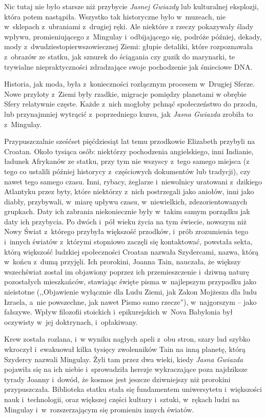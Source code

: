 \documentclass[oneside,polish,12pt,sfheadings]{mwbk}
\begin{document}
Nic tutaj nie było starsze niż przybycie \emph{Jasnej Gwiazdy} lub
kulturalnej eksplozji, która potem nastąpiła. Wszystko tak historyczne
było w~muzeach, nie w~sklepach z~ubraniami z~drugiej ręki. Ale niektóre
z rzeczy pokazywały ślady wpływu, promieniującego z~Mingulay i~odbijającego się, podróże później, dekady, mody z~dwudziestopierwszowiecznej Ziemi: głupie detaliki, które rozpoznawała z~obrazów ze statku, jak sznurek do ściągania czy guzik do marynarki, te
trywialne niepraktyczności zdradzające swoje pochodzenie jak śmieciowe
DNA.

Historia, jak moda, była z~konieczności rozłącznym procesem w~Drugiej
Sferze. Nowe przyloty z~Ziemi były rzadkie, migracje pomiędzy planetami
w obrębie Sfery relatywnie częste. Każde z~nich mogłoby pchnąć
społeczeństwo do przodu, lub przynajmniej wytrącić z~poprzedniego kursu,
jak \emph{Jasna Gwiazda} zrobiła to z~Mingulay.

Przypuszczalnie sześćset pięćdziesiąt lat temu przodkowie Elizabeth
przybyli na Croatan. Około tysiąca osób: niektórzy pochodzenia
angielskiego, inni Indianie, ładunek Afrykanów ze statku, przy tym nie
wszyscy z~tego samego miejsca (z tego co ustalili później historycy z~częściowych dokumentów lub tradycji), czy nawet tego samego czasu. Inni,
rybacy, żeglarze i~niewolnicy uratowani z~dzikiego Atlantyku przez byty,
które niektórzy z~nich postrzegali jako aniołów, inni jako diabły,
przybywali, w~miarę upływu czasu, w~niewielkich, zdezorientowanych
grupkach. Daty ich zabrania niekoniecznie były w~takim samym porządku
jak daty ich przybycia. Po dwóch i~pół wieku życia na tym świecie,
nowszym niż Nowy Świat z~którego przybyła większość przodków, i~prób
zrozumienia tego i~innych światów z~którymi stopniowo zaczęli się
kontaktować, powstała sekta, którą większość ludzkiej społeczności
Croatan nazwała Szydercami, nazwa, którą w~końcu z~dumą przyjęli. Ich
prorokini, Joanna Tain, nauczała, że większy wszechświat został im
objawiony poprzez ich przemieszczenie i~dziwną naturę pozostałych
mieszkańców, stawiając święte pisma w~najlepszym przypadku jako
nieistotne (,,Objawienie wyłącznie dla Ludu Ziemi, jak Zakon Mojżesza dla
ludu Izraela, a~nie powszechne, jak nawet Pismo samo rzecze''), w~najgorszym -- jako fałszywe. Wpływ filozofii stoickich i~epikurejskich w~Nova Babylonia był oczywisty w~jej doktrynach, i~opłakiwany.

Krew została rozlana, i~w wyniku nagłych apeli z~obu stron, szary lud
szybko wkroczył i~ewakuował kilka tysięcy zwolenników Tain na inną
planetę, którą Szydercy nazwali Mingulay. Żyli tam przez dwa wieki,
kiedy \emph{Jasna Gwiazda} pojawiła się na ich niebie i~sprowadziła
herezje wykraczające poza najdziksze tyrady Joanny i~dowód, że kosmos
jest jeszcze dziwniejszy niż prorokini przypuszczała. Biblioteka statku
stała się fundamentem uniwersytetu i~większości nauk i~technologii, oraz
większej części kultury i~sztuki, w~rękach ludzi na Mingulay i~w~rozszerzającym się promieniu innych światów.
\end{document}
